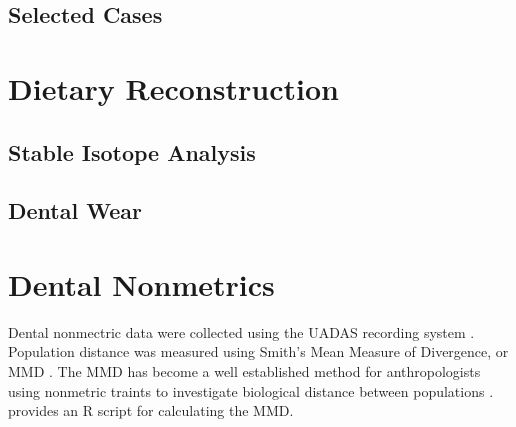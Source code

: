 \documentclass[]{book}
\begin{document}
\subsection{Selected Cases}\label{selected-cases}

\section{Dietary Reconstruction}\label{dietary-reconstruction}

\subsection{Stable Isotope Analysis}\label{stable-isotope-analysis}

\subsection{Dental Wear}\label{dental-wear}

\section{Dental Nonmetrics}\label{dental-nonmetrics}

Dental nonmectric data were collected using the UADAS recording system
\citep{scott2000anthteeth}. Population distance was measured using
Smith's Mean Measure of Divergence, or MMD \citep{smith1977note}. The
MMD has become a well established method for anthropologists using
nonmetric traints to investigate biological distance between populations
\citep{harris2004calculation}. \citet{soltysiak2011mmd} provides an R
script for calculating the MMD.
\end{document}

